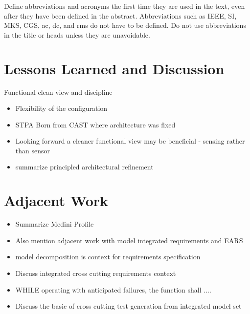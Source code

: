 \documentclass[conference]{IEEEtran}
\begin{document}
Define abbreviations and acronyms the first time they are used in the text, 
even after they have been defined in the abstract. Abbreviations such as 
IEEE, SI, MKS, CGS, ac, dc, and rms do not have to be defined. Do not use 
abbreviations in the title or heads unless they are unavoidable.

\section{Lessons Learned and Discussion}
Functional clean view and discipline

\begin{itemize}
\item Flexibility of the configuration
\item STPA Born from CAST where architecture was fixed
\item Looking forward a cleaner functional view may be beneficial - sensing rather than sensor
\item summarize principled architectural refinement 

\end{itemize}



\section{Adjacent Work }


\begin{itemize}
\item Summarize Medini Profile 

\item  Also mention adjacent  work with model integrated requirements and EARS
\item model decomposition is context for requirements specification
\item Discuss integrated cross cutting requirements context 
\item WHILE operating with anticipated failures, the function shall ....
\item Discuss the basic of cross cutting test generation from integrated model set  

\end{itemize}
\end{document}
